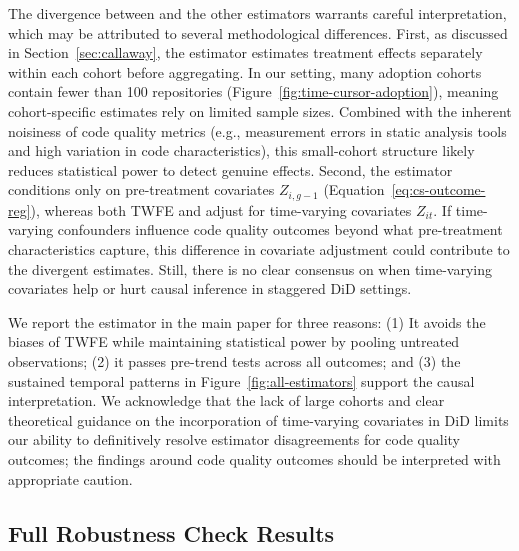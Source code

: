 The divergence between \citet{callaway2021difference} and the other estimators warrants careful interpretation, which may be attributed to several methodological differences. 
First, as discussed in Section~\ref{sec:callaway}, the \citet{callaway2021difference} estimator estimates treatment effects separately within each cohort before aggregating. 
In our setting, many adoption cohorts contain fewer than 100 repositories (Figure~\ref{fig:time-cursor-adoption}), meaning cohort-specific estimates rely on limited sample sizes. 
Combined with the inherent noisiness of code quality metrics (e.g., measurement errors in static analysis tools and high variation in code characteristics), this small-cohort structure likely reduces statistical power to detect genuine effects. 
Second, the \citet{callaway2021difference} estimator conditions only on pre-treatment covariates $Z_{i,g-1}$ (Equation~\ref{eq:cs-outcome-reg}), whereas both TWFE and \citet{borusyak2024revisiting} adjust for time-varying covariates $Z_{it}$. 
If time-varying confounders influence code quality outcomes beyond what pre-treatment characteristics capture, this difference in covariate adjustment could contribute to the divergent estimates. 
Still, there is no clear consensus on when time-varying covariates help or hurt causal inference in staggered DiD settings.

We report the \citet{borusyak2024revisiting} estimator in the main paper for three reasons: (1) It avoids the biases of TWFE while maintaining statistical power by pooling untreated observations; (2) it passes pre-trend tests across all outcomes; and (3) the sustained temporal patterns in Figure~\ref{fig:all-estimators} support the causal interpretation. 
We acknowledge that the lack of large cohorts and clear theoretical guidance on the incorporation of time-varying covariates in DiD limits our ability to definitively resolve estimator disagreements for code quality outcomes; the findings around code quality outcomes should be interpreted with appropriate caution.

\subsection{Full Robustness Check Results}

